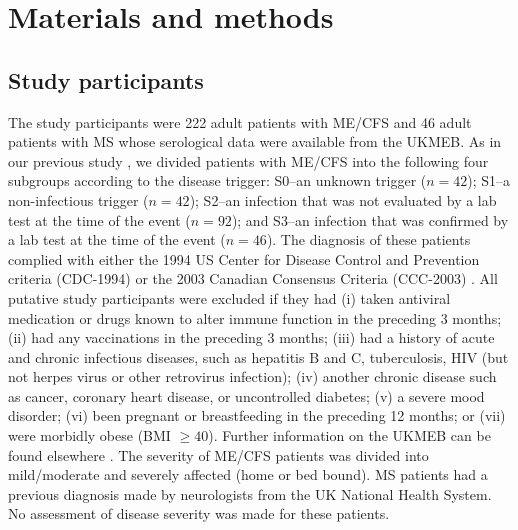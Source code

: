 \section{Materials and methods}

\subsection{Study participants}

The study participants were 222 adult patients with ME/CFS and 46 adult patients with MS whose serological data were available from the UKMEB. As in our previous study \citep{domingues2021HerpesvirusesSerologya}, we divided patients with ME/CFS into the following four subgroups according to the disease trigger: S0--an unknown trigger ($n = 42$); S1--a non-infectious trigger ($n = 42$); S2--an infection that was not evaluated by a lab test at the time of the event ($n = 92$); and S3--an infection that was confirmed by a lab test at the time of the event ($n = 46$). The diagnosis of these patients complied with either the 1994 US Center for Disease Control and Prevention criteria (CDC-1994) \citep{fukuda1994ChronicFatigue} or the 2003 Canadian Consensus Criteria (CCC-2003) \citep{carruthers2003MyalgicEncephalomyelitis}. All putative study participants were excluded if they had (i) taken antiviral medication or drugs known to alter immune function in the preceding 3 months; (ii) had any vaccinations in the preceding 3 months; (iii) had a history of acute and chronic infectious diseases, such as hepatitis B and C, tuberculosis, HIV (but not herpes virus or other retrovirus infection); (iv) another chronic disease such as cancer, coronary heart disease, or uncontrolled diabetes; (v) a severe mood disorder; (vi) been pregnant or breastfeeding in the preceding 12 months; or (vii) were morbidly obese (BMI $\geq40$). Further information on the UKMEB can be found elsewhere \citep{lacerda2017UKME, lacerda2018UKME}. The severity of ME/CFS patients was divided into mild/moderate and severely affected (home or bed bound). MS patients had a previous diagnosis made by neurologists from the UK National Health System. No assessment of disease severity was made for these patients.

